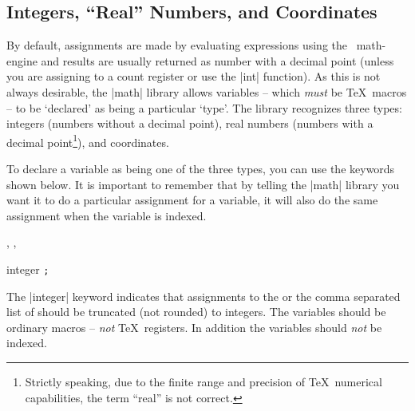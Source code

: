 \subsection{Integers, ``Real'' Numbers, and Coordinates}
	
	By default, assignments are made by evaluating expressions
	using the \pgfname\ math-engine and 
	results	are usually returned as number with a decimal point (unless you
	are assigning to a count register or use the |int| function).
	As this is not always desirable, the |math| library allows
	variables -- which \emph{must} be \TeX\ macros -- to be `declared'
	as being a particular `type'. The library recognizes three types:
	integers (numbers without a decimal point),
	real numbers (numbers with a decimal point\footnote{Strictly speaking, due to the 
	finite range and precision of \TeX\ numerical capabilities, the term ``real'' is
	not correct.}), and coordinates.
	
	To declare a variable as being one of the three types,
	you  can use the keywords shown below. It is important to remember
	that by telling the |math| library you want it to do a
	particular assignment for a variable, it will also do the same 
	assignment when the variable is indexed.
	
\begin{codeexample}[]
, , 
\end{codeexample}



\begin{math-keyword}{{integer} \texttt{;}}

	The |integer| keyword indicates that assignments to the  or 
	the comma separated list of  should be 
	truncated (not rounded) to integers. The variables should be ordinary 
	macros -- \emph{not} \TeX\ registers. In addition the variables
	should \emph{not} be indexed. 

\begin{codeexample}[]
\end{codeexample}

\end{math-keyword}

